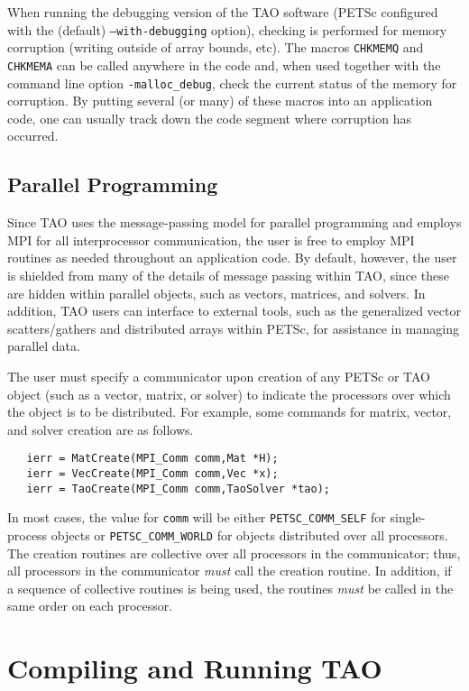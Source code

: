 When running the debugging version of the TAO software (PETSc configured 
with the (default) \texttt{--with-debugging} option), checking is performed for 
memory corruption
(writing outside of array bounds, etc). The macros \texttt{CHKMEMQ} and
\texttt{CHKMEMA} can be called anywhere in the code and, when used together 
with the command line option \texttt{-malloc\_debug}, check the current
status of the memory for corruption.  By putting several (or many) of
these macros into an application code, one can usually track
down the code segment where corruption has occurred.

\subsection*{Parallel Programming}

Since TAO uses the message-passing model for parallel programming and
employs MPI for all interprocessor communication, the user is free to
employ MPI routines as needed throughout an application code.
By default, however, the user is shielded from many of the details of
message passing within TAO, since these are hidden within parallel
objects, such as vectors, matrices, and solvers.  In addition, TAO
users can interface to external tools, such as the generalized vector
scatters/gathers and distributed arrays within PETSc, for assistance in
managing parallel data.

The user must specify a communicator
upon creation of any PETSc or TAO object (such as a vector, matrix, or 
solver)
to indicate the processors over which the object is to be distributed. 
For example, some commands for matrix, vector, and solver creation
are as follows.
\begin{verbatim}
   ierr = MatCreate(MPI_Comm comm,Mat *H);
   ierr = VecCreate(MPI_Comm comm,Vec *x);
   ierr = TaoCreate(MPI_Comm comm,TaoSolver *tao); 
\end{verbatim}
\noindent
In most cases, the value for \texttt{comm} will be either 
\texttt{PETSC\_COMM\_SELF} for single-process objects or 
\texttt{PETSC\_COMM\_WORLD} for objects distributed over all processors.
The creation routines are collective over all processors in the
communicator; thus, all processors in the communicator {\em must} call
the creation routine.  In addition, if a sequence of collective
routines is being used, the routines {\em must} be called in the same
order on each processor.

\section{Compiling and Running TAO}
\label{sec:running}

